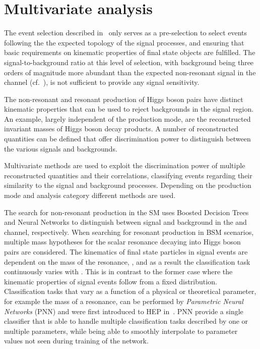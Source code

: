\section{Multivariate analysis}%
\label{sec:multivariate_analysis}

The event selection described in~ only
serves as a pre-selection to select events following the the expected
topology of the signal processes, and ensuring that basic requirements
on kinematic properties of final state objects are fulfilled. %
The signal-to-background ratio at this level of selection, with
background being three orders of magnitude more abundant than the
expected non-resonant \HH signal in the \hadhad channel
(cf.~), is not sufficient to provide
any signal sensitivity.

The non-resonant and resonant production of Higgs boson pairs have
distinct kinematic properties that can be used to reject backgrounds
in the signal region. An example, largely independent of the \HH
production mode, are the reconstructed invariant masses of Higgs boson
decay products. A number of reconstructed quantities can be defined
that offer discrimination power to distinguish between the various
signals and backgrounds.

Multivariate methods are used to exploit the discrimination power of
multiple reconstructed quantities and their correlations, classifying
events regarding their similarity to the signal and background
processes. Depending on the \HH production mode and analysis category
different methods are used.

The search for non-resonant \HH production in the SM uses Boosted
Decision Trees and Neural Networks to distinguish between signal and
background in the \hadhad and \lephad channel, respectively. When
searching for resonant \HH production in BSM scenarios, multiple mass
hypotheses for the scalar resonance decaying into Higgs boson pairs
are considered. The kinematics of final state particles in signal
events are dependent on the mass of the resonance, \mX, and as a
result the classification task continuously varies with \mX. This is
in contrast to the former case where the kinematic properties of
signal events follow from a fixed distribution. Classification tasks
that vary as a function of a physical or theoretical parameter, for
example the mass of a resonance, can be performed by \emph{Parametric
  Neural Networks} (PNN) and were first introduced to HEP
in~\cite{Baldi:2016fzo}. PNN provide a single classifier that is able
to handle multiple classification tasks described by one or multiple
parameters, while being able to smoothly interpolate to parameter
values not seen during training of the network.


